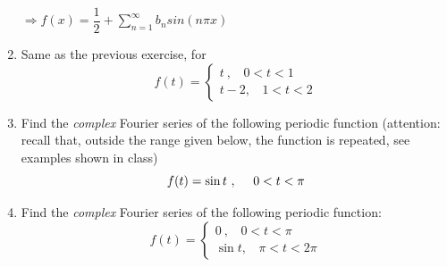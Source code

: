 \documentclass[fleqn]{article}
\begin{document}
\begin{enumerate}
    \textcolor{hwColor}{ 
      $
        \Longrightarrow f(x)=\dfrac{1}{2}+\sum\limits_{n=1}^{\infty}b_n sin(n\pi x)
      $
    }

    \item Same as the previous exercise, for 
    \begin{equation}
      f(t)=\begin{cases}
      t~, ~~~~0< t < 1 \\
      t-2, ~~~~1< t< 2 
      \end{cases}
    \end{equation}


    \item Find the \emph{complex} Fourier series of the following periodic function (attention: recall that, outside the range given below, the function is repeated, see examples shown in class)
      \begin{equation}
      f(t)=\sin t~, ~~~~0< t < \pi \\
      \end{equation}

    \item Find the \emph{complex} Fourier series of the following periodic function: 
    \begin{equation}
      f(t)=\begin{cases}
      0~, ~~~~0< t < \pi \\
      \sin t, ~~~~\pi< t< 2 \pi
      \end{cases}
    \end{equation}


  \end{enumerate}
\end{document}
